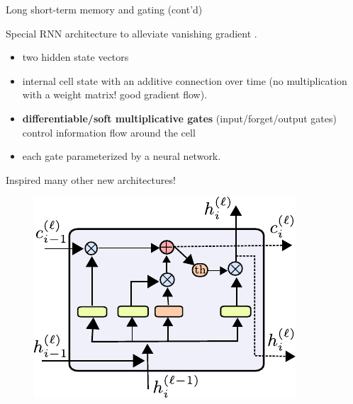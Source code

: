\begin{frame}{Long short-term memory and gating (cont'd)}
\begin{minipage}{0.55\linewidth}
Special RNN architecture to alleviate vanishing gradient .
\begin{itemize}
\item two hidden state vectors
\item internal cell state with an additive connection over time (no multiplication with a weight matrix! good gradient flow).
\item \textbf{differentiable/soft multiplicative gates} (input/forget/output gates) control information flow around the cell
\item each gate parameterized by a neural network.
\end{itemize}
Inspired many other new architectures!
\end{minipage}
\begin{minipage}{0.4\linewidth}
\begin{figure}
                        \centering
                        \includegraphics[width=.9\linewidth]{./figures/lstm.pdf}
\end{figure}
\end{minipage}
\end{frame}
%
